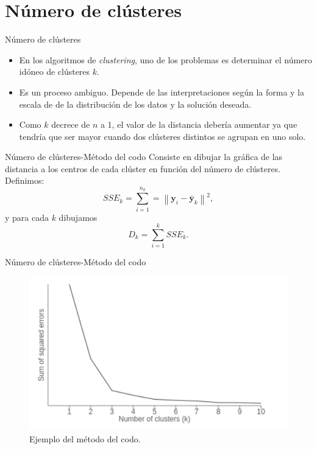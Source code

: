 \documentclass[spanish]{beamer}
\newcommand{\norm}[1]{\left\lVert#1\right\rVert}
\newcommand{\yy}{\textbf{y}}
\begin{document}
\section{Número de clústeres}

\begin{frame}{Número de clústeres}
	\begin{itemize}
		\item En los algoritmos de \textit{clustering}, uno de los problemas es determinar el número idóneo de clústeres $ k $. 
		\item Es un proceso ambiguo. Depende de las interpretaciones según la forma y la escala de de la distribución de los datos y la solución deseada.
		\item Como $ k $ decrece de $ n $ a 1, el valor de la distancia debería aumentar ya que tendría que ser mayor cuando dos clústeres distintos se agrupan en uno solo.
	\end{itemize}
\end{frame}

\begin{frame}{Número de clústeres-Método del codo}
	Consiste en dibujar la gráfica de las distancia a los centros de cada clúster en función del número de clústeres. Definimos:
	\[
	SSE_k = \sum_{i = 1}^{n_k} = \norm{\yy_i - \bar{\yy}_k}^2,
	\]
	y para cada $ k $ dibujamos
	\[
	D_k = \sum_{i = 1} ^ {k} SSE_k.
	\]
\end{frame}

\begin{frame}{Número de clústeres-Método del codo}
	\begin{figure}[h]
		\centering
		\includegraphics[scale=0.5]{pedro/elbowGraph}
		\caption{Ejemplo del método del codo.}
		\label{smkm}
	\end{figure}
\end{frame}
\end{document}
